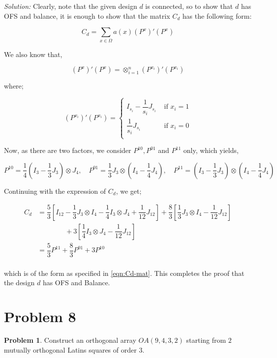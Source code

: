 \documentclass[12pt]{article}
\theoremstyle{definition}
\newtheorem*{prb}{Problem}
\newenvironment{problem}{
\begin{tcolorbox}[colback=blue!5!white,colframe=blue!75!black, parbox = true] \begin{prb}  }{\end{prb}\end{tcolorbox} }
\newenvironment{answer}{\textit{Solution: }\quad }{ \hfill \qedsymbol}
\begin{document}
\begin{answer}
	Clearly, note that the given design $d$ is connected, so to show that $d$ has OFS and balance, it is enough to show that the matrix $C_d$ has the following form:

	\begin{equation}
		C_d = \sum_{x \in \Omega} a(x) (P^x)' (P^x)
		\label{eqn:Cd-mat}
	\end{equation}

	We also know that,

	$$(P^x)'(P^x) = \otimes_{i=1}^{n} (P^{x_i})'(P^{x_i})$$

	where;

	$$(P^{x_i})'(P^{x_i}) = \begin{cases}
		I_{s_i} - \dfrac{1}{s_i} J_{s_i} & \text{ if } x_i = 1\\
		\dfrac{1}{s_i} J_{s_i} & \text{ if } x_i = 0\\
	\end{cases}$$

	Now, as there are two factors, we consider $P^{10}, P^{01}$ and $P^{11}$ only, which yields,

	$$
	P^{10} = \dfrac{1}{4} (I_3 - \dfrac{1}{3} J_3) \otimes J_4,
	\quad 
	P^{01} = \dfrac{1}{3} J_3 \otimes (I_4 - \dfrac{1}{4} J_4),
	\quad
	P^{11} = (I_3 - \dfrac{1}{3} J_3) \otimes (I_4 - \dfrac{1}{4} J_4)
	$$

	Continuing with the expression of $C_d$, we get;

	\begin{align*}
		C_d
		& = \dfrac{5}{3} \left[ I_{12} - \dfrac{1}{3} J_3 \otimes I_4 - \dfrac{1}{4} I_3 \otimes J_4 + \dfrac{1}{12} J_{12} \right] + \dfrac{8}{3} \left[ \dfrac{1}{3} J_3 \otimes I_4 - \dfrac{1}{12} J_{12} \right] \\
		& \qquad \qquad + 3 \left[ \dfrac{1}{4} I_3 \otimes J_4 - \dfrac{1}{12}J_{12} \right] \\
		& = \dfrac{5}{3} P^{11} + \dfrac{8}{3} P^{01} + 3 P^{10}\\
	\end{align*}

	which is of the form as specified in \eqref{eqn:Cd-mat}. This completes the proof that the design $d$ has OFS and Balance.


\end{answer}


\section{Problem 8}

\begin{problem}
	Construct an orthogonal array $OA(9, 4, 3, 2)$ starting from $2$ mutually orthogonal Latins squares of order $3$.
\end{problem}
\end{document}
